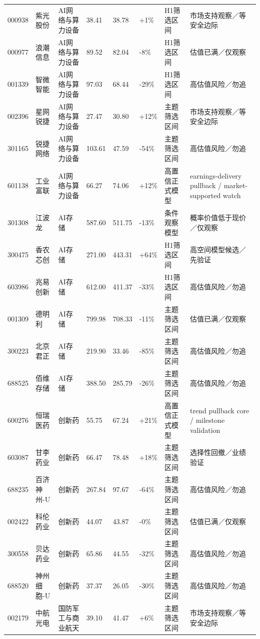 \begin{longtable}{L{1.05cm}L{1.55cm}L{1.75cm}R{0.90cm}R{1.05cm}R{0.90cm}L{1.75cm}L{2.45cm}}
000938 & 紫光股份 & AI网络与算力设备 & 38.41 & 38.78 & +1\% & H1筛选区间 & 市场支持观察／等安全边际 \\
000977 & 浪潮信息 & AI网络与算力设备 & 89.52 & 82.04 & -8\% & H1筛选区间 & 估值已满／仅观察 \\
001339 & 智微智能 & AI网络与算力设备 & 97.03 & 68.44 & -29\% & H1筛选区间 & 高估值风险／勿追 \\
002396 & 星网锐捷 & AI网络与算力设备 & 27.47 & 30.80 & +12\% & 主题筛选区间 & 市场支持观察／等安全边际 \\
301165 & 锐捷网络 & AI网络与算力设备 & 103.61 & 47.59 & -54\% & 主题筛选区间 & 高估值风险／勿追 \\
601138 & 工业富联 & AI网络与算力设备 & 66.27 & 74.06 & +12\% & 高置信正式模型 & earnings-delivery pullback / market-supported watch \\
301308 & 江波龙 & AI存储 & 587.60 & 511.75 & -13\% & 条件观察模型 & 概率价值低于现价／仅观察 \\
300475 & 香农芯创 & AI存储 & 271.00 & 443.31 & +64\% & H1筛选区间 & 高空间模型候选／先验证 \\
603986 & 兆易创新 & AI存储 & 612.00 & 411.37 & -33\% & H1筛选区间 & 高估值风险／勿追 \\
001309 & 德明利 & AI存储 & 799.98 & 708.33 & -11\% & 主题筛选区间 & 估值已满／仅观察 \\
300223 & 北京君正 & AI存储 & 219.90 & 33.46 & -85\% & 主题筛选区间 & 高估值风险／勿追 \\
688525 & 佰维存储 & AI存储 & 388.50 & 285.79 & -26\% & 主题筛选区间 & 高估值风险／勿追 \\
600276 & 恒瑞医药 & 创新药 & 55.75 & 67.24 & +21\% & 高置信正式模型 & trend pullback core / milestone validation \\
603087 & 甘李药业 & 创新药 & 66.47 & 78.48 & +18\% & 主题筛选区间 & 选择性回撤／业绩验证 \\
688235 & 百济神州-U & 创新药 & 267.84 & 97.67 & -64\% & 主题筛选区间 & 高估值风险／勿追 \\
002422 & 科伦药业 & 创新药 & 44.07 & 43.87 & -0\% & 主题筛选区间 & 估值已满／仅观察 \\
300558 & 贝达药业 & 创新药 & 65.86 & 44.55 & -32\% & 主题筛选区间 & 高估值风险／勿追 \\
688520 & 神州细胞-U & 创新药 & 37.37 & 26.05 & -30\% & 主题筛选区间 & 高估值风险／勿追 \\
002179 & 中航光电 & 国防军工与商业航天 & 39.10 & 41.47 & +6\% & 主题筛选区间 & 市场支持观察／等安全边际 \\

\end{longtable}
